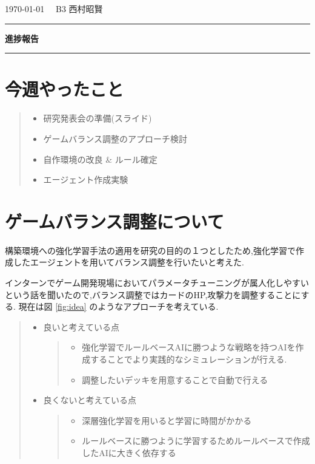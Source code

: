 \documentclass{jarticle}     %
\begin{document}
  \noindent
  \hspace{1em}

  \today
  \hfill
  \ \  B3 西村昭賢 

  \vspace{2mm}
  \hrule
  \begin{center}
  {\Large \bf 進捗報告}
  \end{center}
  \hrule
  \vspace{3mm}


\section{今週やったこと}
\begin{quote}
  \begin{itemize}
   \item 研究発表会の準備(スライド)
   \item ゲームバランス調整のアプローチ検討
   \item 自作環境の改良 \& ルール確定
   \item エージェント作成実験
  \end{itemize}
 \end{quote}

\section{ゲームバランス調整について}
構築環境への強化学習手法の適用を研究の目的の１つとしたため,強化学習で作成したエージェントを用いてバランス調整を行いたいと考えた.\par
インターンでゲーム開発現場においてパラメータチューニングが属人化しやすいという話を聞いたので,バランス調整ではカードのHP,攻撃力を調整することにする.
現在は図 \ref{fig:idea} のようなアプローチを考えている.

\begin{quote}
  \begin{itemize}
   \item 良いと考えている点
   \par
   \begin{quote}
    \begin{itemize}
     \item 強化学習でルールベースAIに勝つような戦略を持つAIを作成することでより実践的なシミュレーションが行える.
     \item 調整したいデッキを用意することで自動で行える
    \end{itemize}
   \end{quote}
   \item 良くないと考えている点
   \par
   \begin{quote}
    \begin{itemize}
     \item 深層強化学習を用いると学習に時間がかかる
     \item ルールベースに勝つように学習するためルールベースで作成したAIに大きく依存する
    \end{itemize}
   \end{quote}
  \end{itemize}
 \end{quote}
\end{document}
